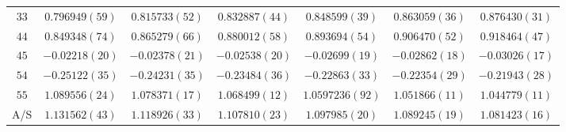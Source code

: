 \begin{table}
\begin{center}
\begin{tabular}{c|c c c c c c}
$33$ & $0.796949(59)$ & $0.815733(52)$ & $0.832887(44)$ & $0.848599(39)$ & $0.863059(36)$ & $0.876430(31)$ \\
$44$ & $0.849348(74)$ & $0.865279(66)$ & $0.880012(58)$ & $0.893694(54)$ & $0.906470(52)$ & $0.918464(47)$ \\
$45$ & $-0.02218(20)$ & $-0.02378(21)$ & $-0.02538(20)$ & $-0.02699(19)$ & $-0.02862(18)$ & $-0.03026(17)$ \\
$54$ & $-0.25122(35)$ & $-0.24231(35)$ & $-0.23484(36)$ & $-0.22863(33)$ & $-0.22354(29)$ & $-0.21943(28)$ \\
$55$ & $1.089556(24)$ & $1.078371(17)$ & $1.068499(12)$ & $1.0597236(92)$ & $1.051866(11)$ & $1.044779(11)$ \\
\hline
A/S & $1.131562(43)$ & $1.118926(33)$ & $1.107810(23)$ & $1.097985(20)$ & $1.089245(19)$ & $1.081423(16)$ \\
\hline
\hline
\end{tabular}
\end{center}
\end{table}